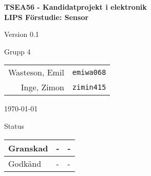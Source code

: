 \documentclass[11pt]{article}
\begin{document}
\begin{titlepage}
\begin{center}

{\Large\bfseries TSEA56 - Kandidatprojekt i elektronik \\ LIPS Förstudie: Sensor}

\vspace{5em}

Version 0.1

\vspace{5em}
Grupp 4 \\
\begin{tabular}{rl}
Wasteson, Emil&\verb+emiwa068+
\\
Inge, Zimon&\verb+zimin415+
\\
\end{tabular}

\vspace{5em}
\today

\vspace{16em}
Status
\begin{longtable}{|l|l|l|} \hline

Granskad & - & - \\ \hline
Godkänd & - & - \\ \hline
 
\end{longtable}

\end{center}
\end{titlepage}
\end{document}
